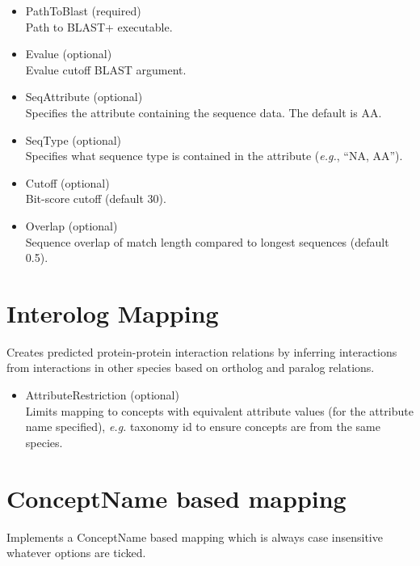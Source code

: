 \begin{itemize}
  
  \item{PathToBlast (required)}\\
  Path to BLAST+ executable.
  
  \item{Evalue (optional)}\\
  Evalue cutoff BLAST argument.
  
  \item{SeqAttribute (optional)}\\
  Specifies the attribute containing the sequence data.
  The default is AA.
  
  \item{SeqType (optional)}\\
  Specifies what sequence type is contained in the attribute ({\it{e.g.}}, ``NA, AA'').
  
  \item{Cutoff (optional)}\\
  Bit-score cutoff (default 30).
  
  \item{Overlap (optional)}\\
  Sequence overlap of match length compared to longest sequences (default 0.5).
 
\end{itemize}
    
\section{Interolog Mapping}
Creates predicted protein-protein interaction relations by inferring interactions 
from interactions in other species based on ortholog and paralog relations.
\begin{itemize}

  \item{AttributeRestriction (optional)}\\
  Limits mapping to concepts with equivalent attribute values (for the attribute name specified),
  {\it{e.g.}} taxonomy id to ensure concepts are from the same species.

\end{itemize}

\section{ConceptName based mapping}
Implements a ConceptName based mapping which is always case insensitive whatever options are ticked.

